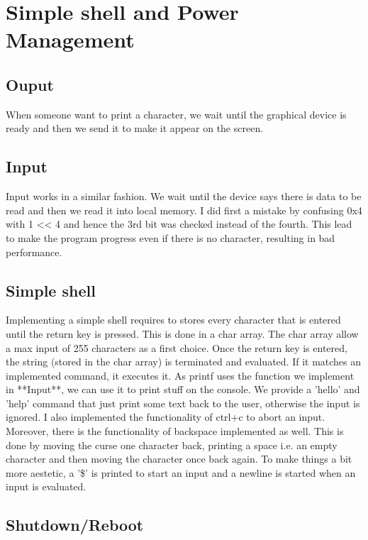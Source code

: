 \section{Simple shell and Power Management}

\subsection{Ouput}

When someone want to print a character, we wait until the graphical device is
ready and then we send it to make it appear on the screen.

\subsection{Input}

Input works in a similar fashion. We wait until the device says there is data to
be read and then we read it into local memory.
I did first a mistake by confusing 0x4 with 1 << 4 and hence the 3rd bit was
checked instead of the fourth. This lead to make the program progress even if
there is no character, resulting in bad performance.

\subsection{Simple shell}

Implementing a simple shell requires to stores every character that is entered
until the return key is pressed. This is done in a char array. The char array
allow a max input of 255 characters as a first choice.
Once the return key is entered, the string (stored in the char array) is
terminated and evaluated. If it matches an implemented command, it executes it.
As printf uses the function we implement in **Input**, we can use it to print
stuff on the console. We provide a 'hello' and 'help' command that just print
some text back to the user, otherwise the input is ignored.
I also implemented the functionality of ctrl+c to abort an input. Moreover,
there is the functionality of backspace implemented as well. This is done by
moving the curse one character back, printing a space i.e. an empty character
and then moving the character once back again.
To make things a bit more aestetic, a '\$' is printed to start an input and a
newline is started when an input is evaluated.

\subsection{Shutdown/Reboot}

